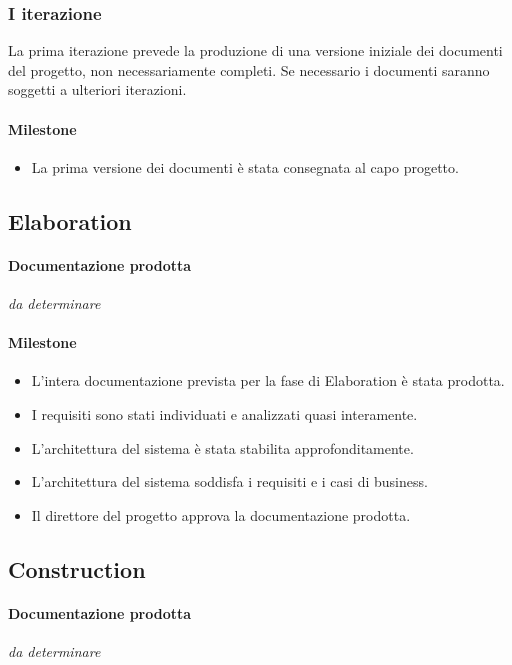 \subsubsection{I iterazione}

La prima iterazione prevede la produzione di una versione iniziale dei documenti del progetto, non necessariamente completi.
Se necessario i documenti saranno soggetti a ulteriori iterazioni.

\paragraph{Milestone}
\begin{itemize}
	\item La prima versione dei documenti \`e stata consegnata al capo progetto.
\end{itemize}

\subsection{Elaboration}

\paragraph{Documentazione prodotta}
\emph{da determinare}

\paragraph{Milestone}
\begin{itemize}
	\item L'intera documentazione prevista per la fase di Elaboration \`e stata prodotta.
	\item I requisiti sono stati individuati e analizzati quasi interamente.
	\item L'architettura del sistema \`e stata stabilita approfonditamente.
	\item L'architettura del sistema soddisfa i requisiti e i casi di business.
	\item Il direttore del progetto approva la documentazione prodotta.
\end{itemize}

\subsection{Construction}

\paragraph{Documentazione prodotta}
\emph{da determinare}

